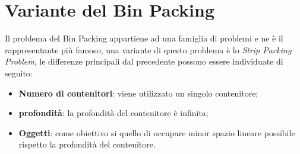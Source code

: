 \section{Variante del Bin Packing}
Il problema del Bin Packing appartiene ad una famiglia di problemi e ne è il rappresentante più famoso, una variante di questo problema è lo \textit{Strip Packing Problem}, le differenze principali dal precedente possono essere individuate di seguito:
\begin{itemize}
	\item \textbf{Numero di contenitori}: viene utilizzato un singolo contenitore;
	\item \textbf{profondità}: la profondità del contenitore è infinita;
	\item \textbf{Oggetti}: come obiettivo si quello di occupare minor spazio lineare possibile rispetto la profondità del contenitore.
\end{itemize}
